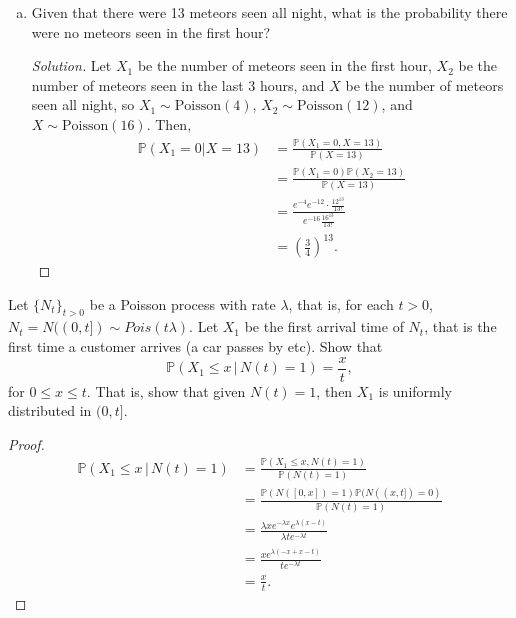 \documentclass[addpoints, 11pt]{exam}
\newcommand*{\prob}{\mathds{P}}
\newenvironment{question}[1]{\smallskip\noindent\color{crimson}{\bf Question #1.}}{}
\begin{document}
\begin{enumerate}[(a)]
    \color{crimson}
    \item Given that there were 13 meteors seen all night, what is the probability there were no meteors seen in the first hour?
    \normalcolor
    
    \begin{proof}[Solution]
        Let $X_1$ be the number of meteors seen in the first hour, $X_2$ be the number of meteors seen in the last 3 hours, and $X$ be the number of meteors seen all night, so $X_1 \sim \text{Poisson}(4)$, $X_2 \sim \text{Poisson}(12)$, and $X \sim \text{Poisson}(16)$. Then,
        \begin{align*}
            \prob(X_1 = 0 | X = 13)
            &= \frac{\prob(X_1 = 0, X = 13)}{\prob(X = 13)} \\
            &= \frac{\prob(X_1 = 0)\prob(X_2 = 13)}{\prob(X = 13)} \\
            &= \frac{e^{-4}e^{-12}\cdot\frac{12^{13}}{13!}}{e^{-16}\frac{16^{13}}{13!}} \\
            &= \left(\frac{3}{4}\right)^{13}.
        \end{align*}
    \end{proof}
\end{enumerate}

\newpage

\begin{question}{2}
    Let $\{N_t\}_{t>0}$ be a Poisson process with rate $\lambda$, that is, for each $t > 0$, $N_t = N((0, t]) \sim Pois(t\lambda)$. Let $X_1$ be the first arrival time of $N_t$, that is the first time a customer arrives (a car passes by etc). Show that
    \[
        \prob(X_1 \leq x \, | \, N(t) = 1) = \frac{x}{t},
    \]
    for $0 \leq x \leq t$. That is, show that given $N(t) = 1$, then $X_1$ is uniformly distributed in $(0, t]$.
\end{question}

\begin{proof}
    \begin{align*}
        \prob(X_1 \leq x \, | \, N(t) = 1)
        &= \frac{\prob(X_1 \leq x, N(t) = 1)}{\prob(N(t) = 1)} \\
        &= \frac{\prob(N([0,x]) = 1)\prob(N((x,t]) = 0)}{\prob(N(t) = 1)} \\
        &= \frac{\lambda xe^{-\lambda x}e^{\lambda(x - t)}}{\lambda te^{-\lambda t}} \\
        &= \frac{xe^{\lambda(-x + x - t)}}{te^{-\lambda t}} \\
        &= \frac{x}{t}.
    \end{align*}
\end{proof}
\end{document}
